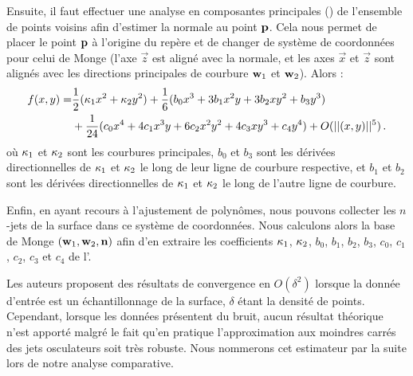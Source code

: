 %
Ensuite, il faut effectuer une analyse en composantes principales (\ACP) de
l'ensemble de points voisins afin d'estimer la normale au point $\mathbf{p}$. Cela
nous permet de placer le point $\mathbf{p}$ à l'origine du repère et de changer de
système de coordonnées pour celui de Monge (l'axe $\vec{z}$ est aligné avec la
normale, et les axes $\vec{x}$ et $\vec{z}$ sont alignés avec les directions
principales de courbure $\mathbf{w}_{1}$ et $\mathbf{w}_{2}$). Alors :
%
\begin{align} \label{eq:monge}
  f(x,y) = & \frac{1}{2}(\kappa_{1}x^2 + \kappa_{2}y^2)+ \frac{1}{6}(b_0x^3+3b_1x^2y+3b_2xy^2+b_3y^3) \\ & +\frac{1}{24}(c_0x^4+4c_1x^3y+6c_2x^2y^2+4c_3xy^3+c_4y^4) + O(||(x,y)||^{5}) \,.
\end{align}
%
où $\kappa_{1}$ et $\kappa_{2}$ sont les courbures principales, $b_0$ et
$b_3$ sont les dérivées directionnelles de $\kappa_{1}$ et $\kappa_{2}$ le
long de leur ligne de courbure respective, et $b_1$ et $b_2$ sont les dérivées
directionnelles de $\kappa_{1}$ et $\kappa_{2}$ le long de l'autre ligne de
courbure.
%


%
Enfin, en ayant recours à l'ajustement de polynômes, nous pouvons collecter
les $n$-jets de la surface dans ce système de coordonnées. Nous calculons alors
la base de Monge $(\mathbf{w}_{1}, \mathbf{w}_{2}, \mathbf{n})$ afin d'en extraire
les coefficients $\kappa_{1}$, $\kappa_{2}$, $b_0$, $b_1$, $b_2$, $b_3$,
$c_0$, $c_1$, $c_2$, $c_3$ et $c_4$ de l'.


%
%
%
Les auteurs proposent des résultats de convergence en $O(\delta^2)$ lorsque la
donnée d'entrée est un échantillonnage de la surface, $\delta$ étant la densité
de points. Cependant, lorsque les données présentent du bruit, aucun résultat
théorique n'est apporté malgré le fait qu'en pratique l'approximation aux
moindres carrés des jets osculateurs soit très robuste.
%
Nous nommerons cet estimateur par la suite \JetFitting lors de notre analyse comparative.
%

